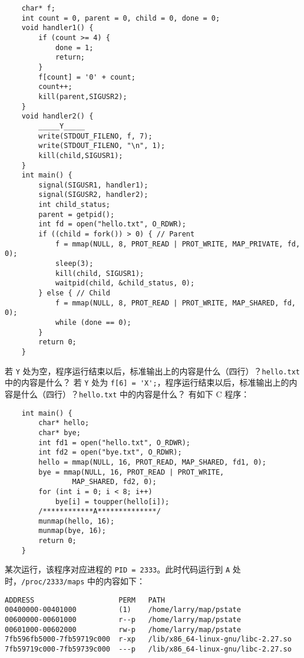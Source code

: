 \begin{problems}
        \begin{verbatim}
    char* f;
    int count = 0, parent = 0, child = 0, done = 0;
    void handler1() {
        if (count >= 4) {
            done = 1;
            return;
        } 
        f[count] = '0' + count;
        count++;
        kill(parent,SIGUSR2);
    }
    void handler2() {
        _____Y_____
        write(STDOUT_FILENO, f, 7);
        write(STDOUT_FILENO, "\n", 1);
        kill(child,SIGUSR1);
    }
    int main() {
        signal(SIGUSR1, handler1);
        signal(SIGUSR2, handler2);
        int child_status;
        parent = getpid();
        int fd = open("hello.txt", O_RDWR);
        if ((child = fork()) > 0) { // Parent
            f = mmap(NULL, 8, PROT_READ | PROT_WRITE, MAP_PRIVATE, fd, 0);
            sleep(3);
            kill(child, SIGUSR1);
            waitpid(child, &child_status, 0);
        } else { // Child
            f = mmap(NULL, 8, PROT_READ | PROT_WRITE, MAP_SHARED, fd, 0);
            while (done == 0);
        }
        return 0;
    }
        \end{verbatim}
        \qn 若 \verb|Y| 处为空，程序运行结束以后，标准输出上的内容是什么（四行）？\verb|hello.txt| 中的内容是什么？
        \qn 若 \verb|Y| 处为 \verb|f[6] = 'X';|，程序运行结束以后，标准输出上的内容是什么（四行）？\verb|hello.txt| 中的内容是什么？
        \pro 有如下 C 程序：
        \begin{verbatim}
    int main() {
        char* hello;
        char* bye;
        int fd1 = open("hello.txt", O_RDWR);
        int fd2 = open("bye.txt", O_RDWR);
        hello = mmap(NULL, 16, PROT_READ, MAP_SHARED, fd1, 0);
        bye = mmap(NULL, 16, PROT_READ | PROT_WRITE,
                MAP_SHARED, fd2, 0);
        for (int i = 0; i < 8; i++)
            bye[i] = toupper(hello[i]);
        /************A**************/
        munmap(hello, 16);
        munmap(bye, 16);
        return 0;
    }
        \end{verbatim}
        某次运行，该程序对应进程的 \verb|PID = 2333|。此时代码运行到 \verb|A| 处时，\verb|/proc/2333/maps| 中的内容如下：
        \begin{verbatim}
ADDRESS                    PERM   PATH 
00400000-00401000          (1)    /home/larry/map/pstate 
00600000-00601000          r--p   /home/larry/map/pstate 
00601000-00602000          rw-p   /home/larry/map/pstate 
7fb596fb5000-7fb59719c000  r-xp   /lib/x86_64-linux-gnu/libc-2.27.so
7fb59719c000-7fb59739c000  ---p   /lib/x86_64-linux-gnu/libc-2.27.so

\end{verbatim}
\end{problems}
